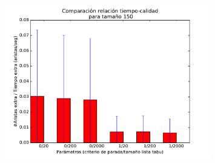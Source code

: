 \begin{figure}[H]
 \centering
	\includegraphics[width=0.8\textwidth]{graficos/problema_6/cociente2.pdf}
	\caption{}
	\label{fig:problema6-cociente2}
\end{figure}


